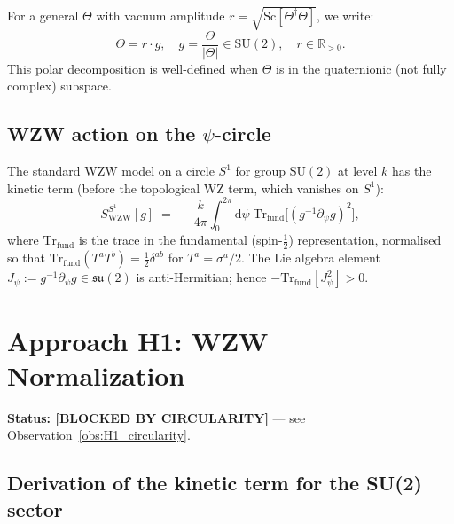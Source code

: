 \documentclass[11pt,a4paper]{article}
\theoremstyle{definition}
\theoremstyle{remark}
\begin{document}
For a general $\Theta$ with vacuum amplitude $r = \sqrt{\mathrm{Sc}[\Theta^\dagger\Theta]}$,
we write:
\begin{equation}
  \Theta = r \cdot g, \quad g = \frac{\Theta}{|\Theta|} \in \mathrm{SU}(2),
  \quad r \in \mathbb{R}_{>0}.
  \label{eq:Theta_polar}
\end{equation}
This polar decomposition is well-defined when $\Theta$ is in the quaternionic
(not fully complex) subspace.

\subsection{WZW action on the \texorpdfstring{$\psi$}{psi}-circle}

The standard WZW model on a circle $S^1$ for group $\mathrm{SU}(2)$ at level $k$
has the kinetic term (before the topological WZ term, which vanishes on $S^1$):
\begin{equation}
  S_{\mathrm{WZW}}^{S^1}[g]
  \;=\; -\frac{k}{4\pi} \int_0^{2\pi} \mathrm{d}\psi\;
    \mathrm{Tr}_{\mathrm{fund}}\!\bigl[(g^{-1}\partial_\psi g)^2\bigr],
  \label{eq:WZW_S1}
\end{equation}
where $\mathrm{Tr}_{\mathrm{fund}}$ is the trace in the fundamental (spin-$\frac{1}{2}$)
representation, normalised so that
$\mathrm{Tr}_{\mathrm{fund}}(T^a T^b) = \tfrac{1}{2}\delta^{ab}$ for
$T^a = \sigma^a/2$.
The Lie algebra element $J_\psi := g^{-1}\partial_\psi g \in \mathfrak{su}(2)$
is anti-Hermitian; hence $-\mathrm{Tr}_{\mathrm{fund}}[J_\psi^2] > 0$.

\section{Approach H1: WZW Normalization}
\label{sec:H1}

\textbf{Status: [BLOCKED BY CIRCULARITY]} — see Observation~\ref{obs:H1_circularity}.

\subsection{Derivation of the kinetic term for the SU(2) sector}
\end{document}
